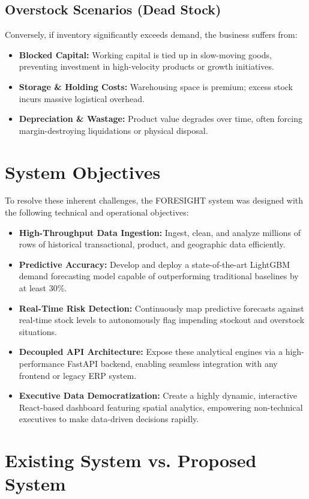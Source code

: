 \documentclass[12pt,a4paper]{report}
\begin{document}
\subsection{Overstock Scenarios (Dead Stock)}
Conversely, if inventory significantly exceeds demand, the business suffers from:
\begin{itemize}
    \item \textbf{Blocked Capital:} Working capital is tied up in slow-moving goods, preventing investment in high-velocity products or growth initiatives.
    \item \textbf{Storage \& Holding Costs:} Warehousing space is premium; excess stock incurs massive logistical overhead.
    \item \textbf{Depreciation \& Wastage:} Product value degrades over time, often forcing margin-destroying liquidations or physical disposal.
\end{itemize}

\section{System Objectives}
To resolve these inherent challenges, the FORESIGHT system was designed with the following technical and operational objectives:
\begin{itemize}
    \item \textbf{High-Throughput Data Ingestion:} Ingest, clean, and analyze millions of rows of historical transactional, product, and geographic data efficiently.
    \item \textbf{Predictive Accuracy:} Develop and deploy a state-of-the-art LightGBM demand forecasting model capable of outperforming traditional baselines by at least 30\%.
    \item \textbf{Real-Time Risk Detection:} Continuously map predictive forecasts against real-time stock levels to autonomously flag impending stockout and overstock situations.
    \item \textbf{Decoupled API Architecture:} Expose these analytical engines via a high-performance FastAPI backend, enabling seamless integration with any frontend or legacy ERP system.
    \item \textbf{Executive Data Democratization:} Create a highly dynamic, interactive React-based dashboard featuring spatial analytics, empowering non-technical executives to make data-driven decisions rapidly.
\end{itemize}

\section{Existing System vs. Proposed System}
\end{document}
